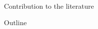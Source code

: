 \documentclass[11pt,aspectratio=169]{beamer}
\newcommand{\ar}{$\Rightarrow$ \ }
\begin{document}
\begin{frame}{Contribution to the literature}
\begin{itemize}[<+->]
	\end{itemize}
\end{frame}
%
\begin{frame}{Outline}
	\tableofcontents
\end{frame}
\end{document}
